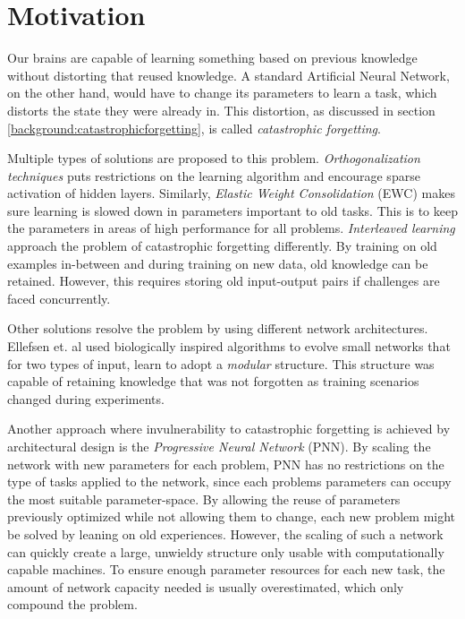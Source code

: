 \section{Motivation}
Our brains are capable of learning something based on previous knowledge without distorting that reused knowledge. A standard Artificial Neural Network, on the other hand, would have to change its parameters to learn a task, which distorts the state they were already in. This distortion, as discussed in section \ref{background:catastrophicforgetting}, is called \textit{catastrophic forgetting}.

Multiple types of solutions are proposed to this problem. \emph{Orthogonalization techniques}\cite{Orthogonal} puts restrictions on the learning algorithm and encourage sparse activation of hidden layers. Similarly, \emph{Elastic Weight Consolidation}\cite{ewc} (EWC) makes sure learning is slowed down in parameters important to old tasks. This is to keep the parameters in areas of high performance for all problems. \emph{Interleaved learning}\cite{interleavedlearning} approach the problem of catastrophic forgetting differently. By training on old examples in-between and during training on new data, old knowledge can be retained. However, this requires storing old input-output pairs if challenges are faced concurrently.

Other solutions resolve the problem by using different network architectures. Ellefsen et. al\cite{kai} used biologically inspired algorithms to evolve small networks that for two types of input, learn to adopt a \textit{modular} structure. This structure was capable of retaining knowledge that was not forgotten as training scenarios changed during experiments. 

Another approach where invulnerability to catastrophic forgetting is achieved by architectural design is the \emph{Progressive Neural Network}\cite{progressiveneuralnetworks} (PNN). By scaling the network with new parameters for each problem, PNN has no restrictions on the type of tasks applied to the network, since each problems parameters can occupy the most suitable parameter-space. By allowing the reuse of parameters previously optimized while not allowing them to change, each new problem might be solved by leaning on old experiences. However, the scaling of such a network can quickly create a large, unwieldy structure only usable with computationally capable machines. To ensure enough parameter resources for each new task, the amount of network capacity needed is usually overestimated, which only compound the problem. 

